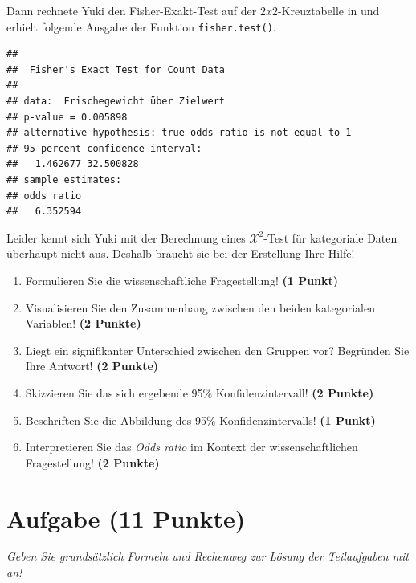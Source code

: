 \documentclass[a4paper, 9pt]{scrartcl}\usepackage[]{graphicx}\usepackage[]{xcolor}
\makeatletter
\newenvironment{kframe}{%
 \def\at@end@of@kframe{}%
 \ifinner\ifhmode%
  \def\at@end@of@kframe{\end{minipage}}%
  \begin{minipage}{\columnwidth}%
 \fi\fi%
 \def\FrameCommand##1{\hskip\@totalleftmargin \hskip-\fboxsep
 \colorbox{shadecolor}{##1}\hskip-\fboxsep
     \hskip-\linewidth \hskip-\@totalleftmargin \hskip\columnwidth}%
 \MakeFramed {\advance\hsize-\width
   \@totalleftmargin\z@ \linewidth\hsize
   \@setminipage}}%
 {\par\unskip\endMakeFramed%
 \at@end@of@kframe}
\newenvironment{knitrout}{}{} %
\makeatother
\begin{document}
Dann rechnete Yuki den Fisher-Exakt-Test auf der $2x2$-Kreuztabelle in \Rlogo und erhielt folgende \Rlogo Ausgabe der Funktion \texttt{fisher.test()}.

\begin{knitrout}
\color{fgcolor}\begin{kframe}
\begin{verbatim}
## 
## 	Fisher's Exact Test for Count Data
## 
## data:  Frischegewicht über Zielwert
## p-value = 0.005898
## alternative hypothesis: true odds ratio is not equal to 1
## 95 percent confidence interval:
##   1.462677 32.500828
## sample estimates:
## odds ratio 
##   6.352594
\end{verbatim}
\end{kframe}
\end{knitrout}

Leider kennt sich Yuki mit der Berechnung eines $\mathcal{X}^2$-Test für kategoriale Daten überhaupt nicht aus. Deshalb braucht sie bei der Erstellung Ihre Hilfe!

\begin{enumerate}
\item Formulieren Sie die wissenschaftliche Fragestellung! \textbf{(1 Punkt)}
\item Visualisieren Sie den Zusammenhang zwischen den beiden kategorialen Variablen! \textbf{(2 Punkte)}
\item Liegt ein signifikanter Unterschied zwischen den Gruppen vor? Begründen Sie Ihre Antwort! \textbf{(2 Punkte)}
\item Skizzieren Sie das sich ergebende 95\% Konfidenzintervall! \textbf{(2 Punkte)}
\item Beschriften Sie die Abbildung des 95\% Konfidenzintervalls! \textbf{(1 Punkt)} 
\item Interpretieren Sie das \textit{Odds ratio} im Kontext der wissenschaftlichen Fragestellung! \textbf{(2 Punkte)} 
\end{enumerate}
 
\clearpage

\section{Aufgabe \hfill (11 Punkte)}

\textit{Geben Sie grundsätzlich Formeln und Rechenweg zur Lösung der Teilaufgaben mit an!} \\[1Ex]
 
\end{document}
